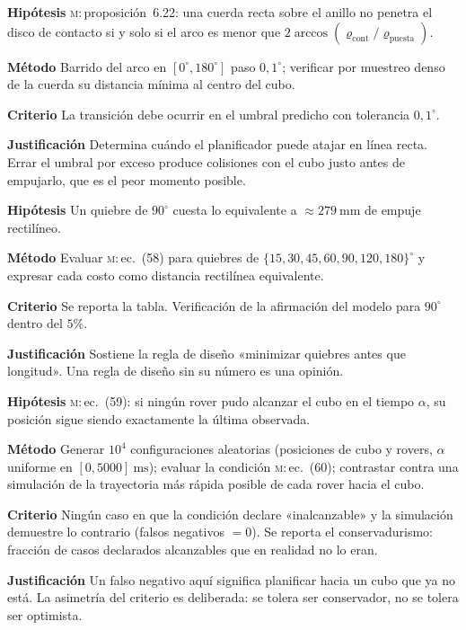 \documentclass[11pt,a4paper]{article}
\newcommand{\grados}{^{\circ}}
\newenvironment{prueba}[2]{%
  \par\medskip\noindent
  \begin{tcolorbox}[enhanced,breakable,colback=white,colframe=black!45,
    boxrule=0.5pt,arc=1pt,left=6pt,right=6pt,top=4pt,bottom=4pt,
    title={\bfseries #1\quad\normalfont #2},
    colbacktitle=black!8,coltitle=black,fonttitle=\bfseries\small]
  \small
}{\end{tcolorbox}\par\medskip}
\newcommand{\campo}[1]{\par\smallskip\noindent\textbf{#1}\quad\ignorespaces}
\begin{document}
\begin{prueba}{N3.5}{Umbral de cuerda del anillo de aproximación}
\campo{Hipótesis} \textsc{m}:\,proposición~6.22: una cuerda recta sobre el anillo no penetra el
disco de contacto si y solo si el arco es menor que
$2\arccos(\varrho_{\mathrm{cont}}/\varrho_{\mathrm{puesta}})$.
\campo{Método} Barrido del arco en $[0\grados, 180\grados]$ paso $0{,}1\grados$;
verificar por muestreo denso de la cuerda su distancia mínima al centro del cubo.
\campo{Criterio} La transición debe ocurrir en el umbral predicho con tolerancia
$0{,}1\grados$.
\campo{Justificación} Determina cuándo el planificador puede atajar en línea recta.
Errar el umbral por exceso produce colisiones con el cubo justo antes de empujarlo,
que es el peor momento posible.
\end{prueba}

\begin{prueba}{N3.6}{Costo relativo de un quiebre de trayectoria}
\campo{Hipótesis} Un quiebre de $90\grados$ cuesta lo equivalente a
$\approx279\ \mathrm{mm}$ de empuje rectilíneo.
\campo{Método} Evaluar \textsc{m}:\,ec.~(58) para quiebres de
$\{15,30,45,60,90,120,180\}\grados$ y expresar cada costo como distancia rectilínea
equivalente.
\campo{Criterio} Se reporta la tabla. Verificación de la afirmación del modelo para
$90\grados$ dentro del $5\%$.
\campo{Justificación} Sostiene la regla de diseño «minimizar quiebres antes que
longitud». Una regla de diseño sin su número es una opinión.
\end{prueba}

\begin{prueba}{N3.7}{Conjunto alcanzable condicional bajo oclusión}
\campo{Hipótesis} \textsc{m}:\,ec.~(59): si ningún rover pudo alcanzar el cubo en el
tiempo $\alpha$, su posición sigue siendo exactamente la última observada.
\campo{Método} Generar $10^4$ configuraciones aleatorias (posiciones de cubo y rovers,
$\alpha$ uniforme en $[0, 5000]\ \mathrm{ms}$); evaluar la condición
\textsc{m}:\,ec.~(60); contrastar contra una simulación de la trayectoria más rápida
posible de cada rover hacia el cubo.
\campo{Criterio} Ningún caso en que la condición declare «inalcanzable» y la simulación
demuestre lo contrario (falsos negativos $=0$). Se reporta el conservadurismo: fracción
de casos declarados alcanzables que en realidad no lo eran.
\campo{Justificación} Un falso negativo aquí significa planificar hacia un cubo que ya
no está. La asimetría del criterio es deliberada: se tolera ser conservador, no se
tolera ser optimista.
\end{prueba}
\end{document}
